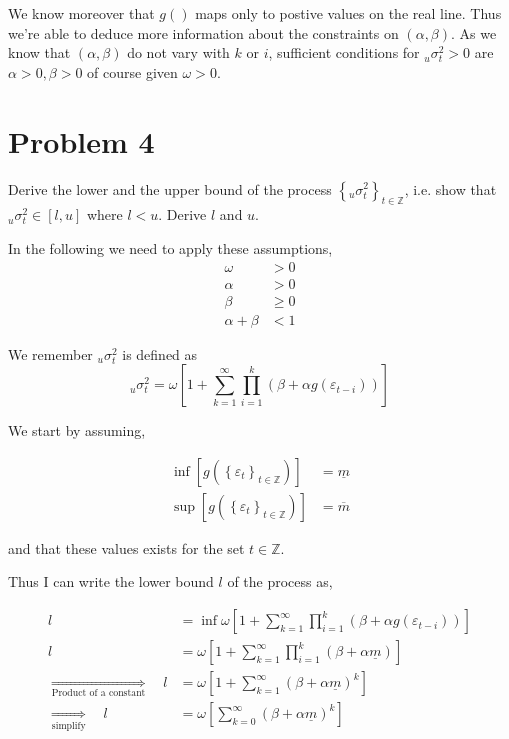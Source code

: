 \documentclass{EconHomework}
\begin{document}
\bigskip

We know moreover that $g()$ maps only to postive values on the real line. Thus we're able to deduce more information about the constraints on $(\alpha,\beta)$. As we know that $(\alpha,\beta)$ do not vary with $k$ or $i$, sufficient conditions for $_{u}\sigma_{t}^{2}>0$ are $\alpha>0,\beta>0$ of course given $\omega>0$.




\section{Problem 4}

\begin{tcolorbox}[colback=white]
    Derive the lower and the upper bound of the process $\left\{{ }_{u} \sigma_{t}^{2}\right\}_{t \in \mathbb{Z}}$, i.e. show that ${ }_{u} \sigma_{t}^{2} \in[l, u]$ where $l<u$. Derive $l$ and $u$.
\end{tcolorbox}

In the following we need to apply these assumptions, 
\begin{align*}
    \omega & >0\\
    \alpha & >0\\
    \beta & \geq0\\
    \alpha+\beta & <1
\end{align*}


We remember $_{u}\sigma_{t}^{2}$ is defined as
\[
_{u}\sigma_{t}^{2}=\omega\left[1+\sum_{k=1}^{\infty}\prod_{i=1}^{k}\left(\beta+\alpha g\left(\varepsilon_{t-i}\right)\right)\right]
\]

We start by assuming,

\begin{align*}
    \inf\left[g\left(\left\{ \varepsilon_{t}\right\} _{t\in\mathbb{Z}}\right)\right]&=\underline{m}\\\sup\left[g\left(\left\{ \varepsilon_{t}\right\} _{t\in\mathbb{Z}}\right)\right]&=\overline{m}
\end{align*}

and that these values exists for the set $t\in\mathbb{Z}$.

\bigskip

Thus I can write the lower bound $l$ of the process as,

\begin{align*}
    l&=\inf\omega\left[1+\sum_{k=1}^{\infty}\prod_{i=1}^{k}\left(\beta+\alpha g\left(\varepsilon_{t-i}\right)\right)\right]\\
    l&=\omega\left[1+\sum_{k=1}^{\infty}\prod_{i=1}^{k}\left(\beta+\alpha\underline{m}\right)\right]\\
    \underset{\text{Product of a constant}}{\Longrightarrow}\quad l&=\omega\left[1+\sum_{k=1}^{\infty}\left(\beta+\alpha\underline{m}\right)^{k}\right]\\
    \underset{\text{simplify}}{\Longrightarrow}\quad l&=\omega\left[\sum_{k=0}^{\infty}\left(\beta+\alpha\underline{m}\right)^{k}\right]
\end{align*}
\end{document}
